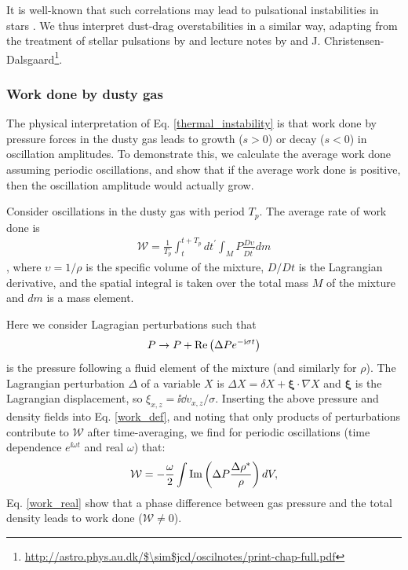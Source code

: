 It is well-known that such correlations may lead to pulsational
instabilities in stars \citep{cox67}. We thus interpret  
dust-drag overstabilities in a similar way, 
adapting from the treatment of stellar 
pulsations by \cite{cox67} and lecture notes by \cite{samadi15} and 
J. Christensen-Dalsgaard\footnote{\url{http://astro.phys.au.dk/$\sim$jcd/oscilnotes/print-chap-full.pdf}}.        
 


\subsubsection{Work done by dusty gas} 

The physical interpretation of Eq. \ref{thermal_instability} is that 
work done by pressure forces in the dusty gas leads to growth { ($s>0$) or decay ($s<0$)} 
in oscillation amplitudes. 
To demonstrate this, we calculate the average
work done assuming periodic oscillations, and show that if the average
work done is positive, then the oscillation amplitude would actually grow. 

Consider oscillations in the dusty gas with period $T_p$. 
The average rate of work done is 
\begin{align}
  \mathcal{W} = \frac{1}{T_p}\int^{t+T_p}_{t}dt^\prime\int_M P
  \frac{D\upsilon}{Dt^\prime} dm \label{work_def} 
\end{align}
\citep[][see their Eq. 4.10 and related discussions]{cox67}, 
where $\upsilon=1/\rho$ is the specific volume of the mixture, $D/Dt$
is the Lagrangian derivative, and the 
spatial integral is taken over the total mass $M$ of the mixture and
$dm$ is a mass element. 

{ Here we consider Lagragian perturbations such that 
  \begin{align}
 P \to P + \operatorname{Re}\left(\Delta P e^{-\mathrm{i}\sigma t}\right)
 \end{align}
is the pressure following a fluid element of the mixture (and similarly for $\rho$). 
 The Lagrangian perturbation $\Delta$ of a variable $X$ is $\Delta X = \delta X + \bm{\xi}\cdot\nabla X$
 and $\bm{\xi}$ is the Lagrangian displacement, so $\xi_{x,z} =  \ii\dd
 v_{x,z}/\sigma$. Inserting the above pressure and density fields
 into Eq. \ref{work_def}, and noting that only products of
 perturbations contribute to $\mathcal{W}$ after time-averaging, we
 find for periodic oscillations (time dependence $e^{\ii\omega t}$ and
 real $\omega$) that:  
}
\begin{align}
  \mathcal{W} = - \frac{\omega}{2} \int \operatorname{Im}\left(\Delta P
  \frac{\Delta \rho^*}{\rho}\right)dV,\label{work_real}
\end{align}
Eq. \ref{work_real} show that a phase difference between gas pressure and
the total density leads to work done
($\mathcal{W}\neq0$).  

